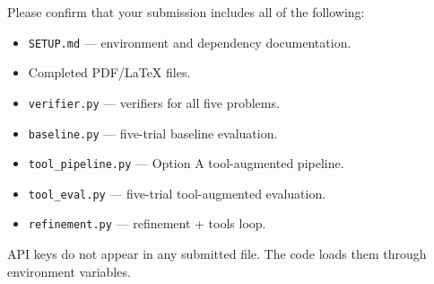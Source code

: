 \documentclass[12pt]{article}
\begin{document}
Please confirm that your submission includes all of the following:

\begin{itemize}[leftmargin=1.2em]
  \item[\texttt{[x]}] \texttt{SETUP.md} --- environment and dependency documentation.
  \item[\texttt{[x]}] Completed PDF/\LaTeX{} files.
  \item[\texttt{[x]}] \texttt{verifier.py} --- verifiers for all five problems.
  \item[\texttt{[x]}] \texttt{baseline.py} --- five-trial baseline evaluation.
  \item[\texttt{[x]}] \texttt{tool\_pipeline.py} --- Option A tool-augmented pipeline.
  \item[\texttt{[x]}] \texttt{tool\_eval.py} --- five-trial tool-augmented evaluation.
  \item[\texttt{[x]}] \texttt{refinement.py} --- refinement + tools loop.
\end{itemize}

\medskip
\noindent
API keys do not appear in any submitted file. The code loads them through environment variables.
\end{document}
